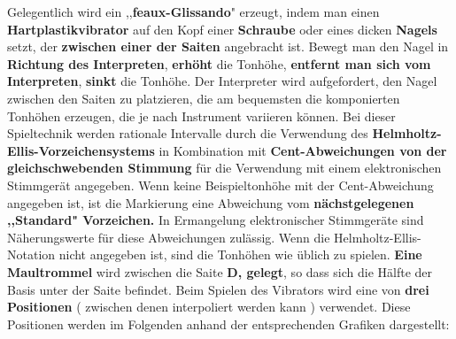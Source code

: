 \documentclass[12pt]{article}
\newcommand*\circled[1]{\tikz[baseline=(char.base)]{
            \node[shape=circle,draw,inner sep=1pt] (char) {#1};}}
\begin{document}
\textbf{\circled{2}} Gelegentlich wird ein ,,\textbf{feaux-Glissando}" erzeugt, indem man einen \textbf{Hartplastikvibrator} auf den Kopf einer \textbf{Schraube} oder eines dicken \textbf{Nagels} setzt, der \textbf{zwischen einer der Saiten} angebracht ist. Bewegt man den Nagel in \textbf{Richtung des Interpreten}, \textbf{erhöht} die Tonhöhe, \textbf{entfernt man sich vom Interpreten}, \textbf{sinkt} die Tonhöhe. Der Interpreter wird aufgefordert, den Nagel zwischen den Saiten zu platzieren, die am bequemsten die komponierten Tonhöhen erzeugen, die je nach Instrument variieren können. Bei dieser Spieltechnik werden rationale Intervalle durch die Verwendung des \textbf{Helmholtz-Ellis-Vorzeichensystems} in Kombination mit \textbf{Cent-Abweichungen von der gleichschwebenden Stimmung} für die Verwendung mit einem elektronischen Stimmgerät angegeben. Wenn keine Beispieltonhöhe mit der Cent-Abweichung angegeben ist, ist die Markierung eine Abweichung vom \textbf{nächstgelegenen ,,Standard" Vorzeichen.} In Ermangelung elektronischer Stimmgeräte sind Näherungswerte für diese Abweichungen zulässig. Wenn die Helmholtz-Ellis-Notation nicht angegeben ist, sind die Tonhöhen wie üblich zu spielen.  \textbf{\circled{3} Eine Maultrommel} wird zwischen die Saite \textbf{D, gelegt}, so dass sich die Hälfte der Basis unter der Saite befindet. Beim Spielen des Vibrators wird eine von \textbf{drei Positionen} ( zwischen denen interpoliert werden kann ) verwendet. Diese Positionen werden im Folgenden anhand der entsprechenden Grafiken dargestellt:
\end{document}
